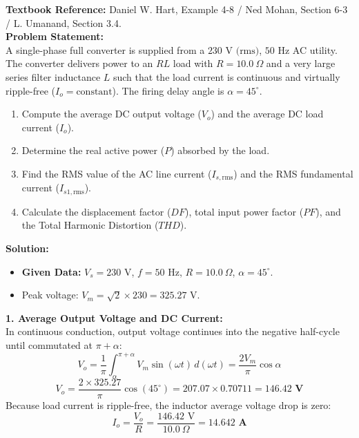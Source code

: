 \documentclass[10pt,a4paper]{article}
\begin{document}
\begin{tcolorbox}[qbox, title={Question 2: Single-Phase Full Converter with RL Load (Continuous, Ripple-Free Current)}]
\textbf{Textbook Reference:} Daniel W. Hart, Example 4-8 / Ned Mohan, Section 6-3 / L. Umanand, Section 3.4.\\[1mm]
\textbf{Problem Statement:}\\
A single-phase full converter is supplied from a $230\text{ V (rms)}$, $50\text{ Hz}$ AC utility. The converter delivers power to an $RL$ load with $R = 10.0\ \Omega$ and a very large series filter inductance $L$ such that the load current is continuous and virtually ripple-free ($I_o = \text{constant}$). The firing delay angle is $\alpha = 45^\circ$.
\begin{enumerate}
  \item Compute the average DC output voltage ($V_o$) and the average DC load current ($I_o$).
  \item Determine the real active power ($P$) absorbed by the load.
  \item Find the RMS value of the AC line current ($I_{s,\text{rms}}$) and the RMS fundamental current ($I_{s1,\text{rms}}$).
  \item Calculate the displacement factor ($DF$), total input power factor ($PF$), and the Total Harmonic Distortion ($THD$).
\end{enumerate}
\end{tcolorbox}

\vspace{1mm}
\noindent\textbf{\textcolor{accentteal}{Solution:}}
\begin{itemize}
  \item \textbf{Given Data:} $V_s = 230\text{ V}$, $f = 50\text{ Hz}$, $R = 10.0\ \Omega$, $\alpha = 45^\circ$.
  \item Peak voltage: $V_m = \sqrt{2} \times 230 = 325.27\text{ V}$.
\end{itemize}

\noindent\textbf{1. Average Output Voltage and DC Current:}\\
In continuous conduction, output voltage continues into the negative half-cycle until commutated at $\pi + \alpha$:
\[
V_o = \frac{1}{\pi} \int_{\alpha}^{\pi + \alpha} V_m \sin(\omega t)\, d(\omega t) = \frac{2 V_m}{\pi} \cos\alpha
\]
\[
V_o = \frac{2 \times 325.27}{\pi} \cos(45^\circ) = 207.07 \times 0.70711 = \mathbf{146.42\text{ V}}
\]
Because load current is ripple-free, the inductor average voltage drop is zero:
\[
I_o = \frac{V_o}{R} = \frac{146.42\text{ V}}{10.0\ \Omega} = \mathbf{14.642\text{ A}}
\]
\end{document}
